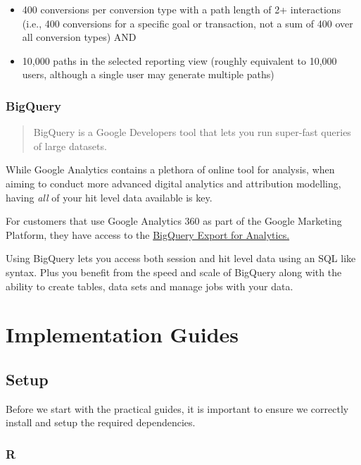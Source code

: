 \documentclass[]{book}
\providecommand{\tightlist}{%
  \setlength{\itemsep}{0pt}\setlength{\parskip}{0pt}}
\begin{document}
\begin{itemize}
\tightlist
\item
  400 conversions per conversion type with a path length of 2+
  interactions (i.e., 400 conversions for a specific goal or
  transaction, not a sum of 400 over all conversion types) AND\\
\item
  10,000 paths in the selected reporting view (roughly equivalent to
  10,000 users, although a single user may generate multiple paths)
\end{itemize}

\section{BigQuery}\label{bigquery}

\begin{quote}
BigQuery is a Google Developers tool that lets you run super-fast
queries of large datasets.
\end{quote}

While Google Analytics contains a plethora of online tool for analysis,
when aiming to conduct more advanced digital analytics and attribution
modelling, having \emph{all} of your hit level data available is key.
\citep{noauthor_bigquery_nodate}

For customers that use Google Analytics 360 as part of the Google
Marketing Platform, they have access to the
\href{https://support.google.com/analytics/answer/3437618?hl=en\&ref_topic=3416089}{BigQuery
Export for Analytics.}

Using BigQuery lets you access both session and hit level data using an
SQL like syntax. Plus you benefit from the speed and scale of BigQuery
along with the ability to create tables, data sets and manage jobs with
your data.

\part{Implementation
Guides}\label{part-implementation-guides}

\chapter{Setup}\label{setup}

Before we start with the practical guides, it is important to ensure we
correctly install and setup the required dependencies.

\section{R}\label{r}
\end{document}
